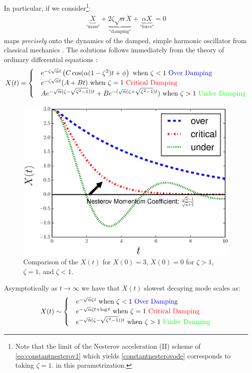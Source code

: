 In particular, if we consider\footnote{Note that the limit of the Nesterov acceleration (II) scheme of \eqref{eq:constantnesterov1} which yields \eqref{constantnesterovode} corresponds to taking $\zeta=1$. in this parametrization.}:
\begin{align*}
   \underbrace{\ddot{X}}_{\text{``mass"}} + \underbrace{2 \zeta \sqrt{\alpha} \dot{X}}_{\text{``damping"}} + \underbrace{\alpha X}_{\text{``force"}} = 0
\end{align*}
maps \textit{precisely} onto the dynamics of the damped, simple harmonic oscillator from classical mechanics \cite{morin2008introduction}. The solutions follows immediately from the theory of ordinary differential equations \cite{morin2008introduction}:  
\begin{align*}
   X(t) = \begin{cases}
   & e^{-\zeta \sqrt{\alpha} t} \left( C \cos(\alpha(1-\zeta^2) t+\phi \right) \text{ when } \zeta < 1 \ \textcolor{blue}{\text{Over Damping}}  \\
   & e^{-\zeta \sqrt{\alpha} t}(A+B t) \text{ when } \zeta = 1 \ \textcolor{red}{\text{Critical Damping}} \\
   & A e^{-\sqrt{\alpha}(\zeta - \sqrt{\zeta^2-1})) t}+ B e^{ -(\sqrt{\alpha}(\zeta + \sqrt{\zeta^2-1}) t})   \text{ when } \zeta > 1 \ \textcolor{green}{\text{Under Damping}} 
   \end{cases}
\end{align*}

\begin{figure}[!h]
\begin{center}
\includegraphics[width=0.6\linewidth]{Experiments/critical_damp_Nesterov.eps}
\caption{Comparison of the $X(t)$ for $X(0)=3$, $\dot{X}(0)=0$ for $\zeta > 1$, $\zeta=1$, and $\zeta < 1$.}
\end{center}
\end{figure}

Asymptotically as $t \to \infty$ we have that $X(t)$ slowest decaying mode scales as:
\begin{align*}
   X(t) \sim \begin{cases}
   & e^{-\sqrt{\alpha} \zeta t}\text{ when } \zeta < 1 \ \textcolor{blue}{\text{Over Damping}} \\
   & e^{-\sqrt{\alpha} \zeta t + \log t} \text{ when } \zeta = 1 \ \textcolor{red}{\text{Critical Damping}} \\
   & e^{-\sqrt{\alpha}(\zeta - \sqrt{\zeta^2-1})) t}  \text{ when } \zeta > 1 \ \textcolor{green}{\text{Under Damping}} 
   \end{cases}
\end{align*}

